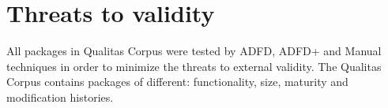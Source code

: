 \documentclass[runningheads,a4paper]{llncs}
\begin{document}




%		 





\section{Threats to validity} \label{sec:threat}
All packages in Qualitas Corpus were tested by ADFD, ADFD+ and Manual techniques in order to minimize the threats to external validity. The Qualitas Corpus contains packages of different: functionality, size, maturity and modification histories.
\end{document}

